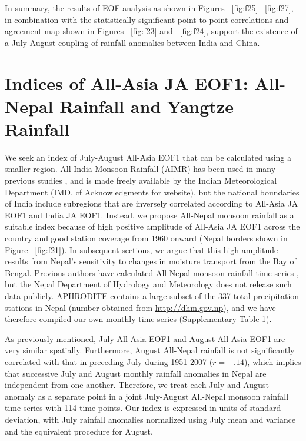 	In summary, the results of EOF analysis as shown in Figures ~\ref{fig:f25}-~\ref{fig:f27}, in combination with the statistically significant point-to-point correlations and agreement map shown in Figures ~\ref{fig:f23} and ~\ref{fig:f24}, support the existence of a July-August coupling of rainfall anomalies between India and China.

\section{Indices of All-Asia JA EOF1: All-Nepal Rainfall and Yangtze Rainfall}
   
	We seek an index of July-August All-Asia EOF1 that can be calculated using a smaller region. All-India Monsoon Rainfall (AIMR) has been used in many previous studies \citep{Parthasarathy1994}, and is made freely available by the Indian Meteorological Department (IMD, cf Acknowledgments for website), but the national boundaries of India include subregions that are inversely correlated according to All-Asia JA EOF1 and India JA EOF1. Instead, we propose All-Nepal monsoon rainfall as a suitable index because of high positive amplitude of All-Asia JA EOF1 across the country and good station coverage from 1960 onward (Nepal borders shown in Figure ~\ref{fig:f21}). In subsequent sections, we argue that this high amplitude results from Nepal's sensitivity to changes in moisture transport from the Bay of Bengal. Previous authors have calculated All-Nepal monsoon rainfall time series \citep{Kansakar2004}, but the Nepal Department of Hydrology and Meteorology does not release such data publicly. APHRODITE contains a large subset of the 337 total precipitation stations in Nepal (number obtained from \url{http://dhm.gov.np}), and we have therefore compiled our own monthly time series (Supplementary Table 1). 
	
	As previously mentioned, July All-Asia EOF1 and August All-Asia EOF1 are very similar spatially. Furthermore, August All-Nepal rainfall is not significantly correlated with that in preceding July during 1951-2007 ($r=-.14$), which implies that successive July and August monthly rainfall anomalies in Nepal are independent from one another. Therefore, we treat each July and August anomaly as a separate point in a joint July-August All-Nepal monsoon rainfall time series with 114 time points. Our index is expressed in units of standard deviation, with July rainfall anomalies normalized using July mean and variance and the equivalent procedure for August.
	
